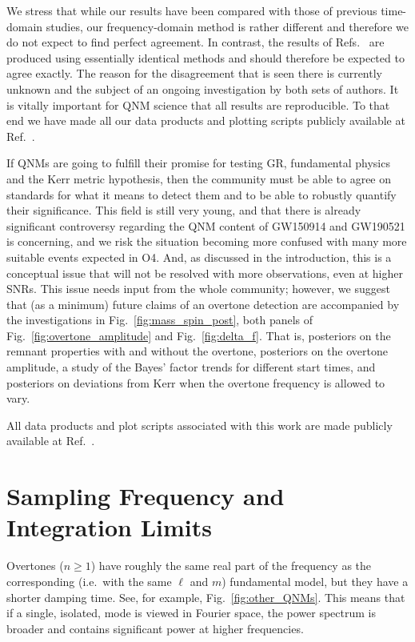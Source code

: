 We stress that while our results have been compared with those of previous time-domain studies, our frequency-domain method is rather different and therefore we do not expect to find perfect agreement. 
In contrast, the results of Refs.~\cite{Isi:2019aib, Cotesta:2022pci, Isi:2022mhy} are produced using essentially identical methods and should therefore be expected to agree exactly. 
The reason for the disagreement that is seen there is currently unknown and the subject of an ongoing investigation by both sets of authors.
It is vitally important for QNM science that all results are reproducible. To that end we have made all our data products and plotting scripts publicly available at Ref.~\cite{finch_eliot_2022_6949492}.

If QNMs are going to fulfill their promise for testing GR, fundamental physics and the Kerr metric hypothesis, then the community must be able to agree on standards for what it means to detect them and to be able to robustly quantify their significance. 
This field is still very young, and that there is already significant controversy regarding the QNM content of GW150914 and GW190521 is concerning, and we risk the situation becoming more confused with many more suitable events expected in O4.
And, as discussed in the introduction, this is a conceptual issue that will not be resolved with more observations, even at higher SNRs.
This issue needs input from the whole community; however, we suggest that (as a minimum) future claims of an overtone detection are accompanied by the investigations in Fig.~\ref{fig:mass_spin_post}, both panels of Fig.~\ref{fig:overtone_amplitude} and Fig.~\ref{fig:delta_f}.
That is, posteriors on the remnant properties with and without the overtone, posteriors on the overtone amplitude, a study of the Bayes' factor trends for different start times, and posteriors on deviations from Kerr when the overtone frequency is allowed to vary.

All data products and plot scripts associated with this work are made publicly available at Ref.~\cite{finch_eliot_2022_6949492}.


\section{Sampling Frequency and Integration Limits}\label{app:fhigh}

Overtones ($n \geq 1$) have roughly the same real part of the frequency as the corresponding (i.e.\ with the same $\ell$ and $m$) fundamental model, but they have a shorter damping time. 
See, for example, Fig.~\ref{fig:other_QNMs}. 
This means that if a single, isolated, mode is viewed in Fourier space, the power spectrum is broader and contains significant power at higher frequencies.

